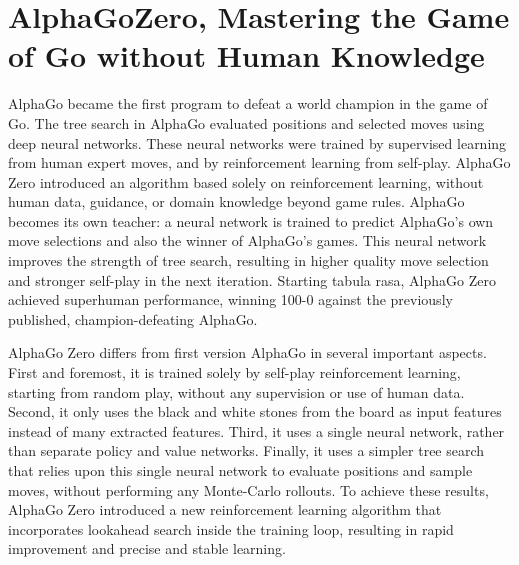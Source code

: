 \documentclass[12pt,a4paper]{report}
\begin{document}
\section{AlphaGoZero, Mastering the Game of Go without Human Knowledge}

\hspace{0.6cm} AlphaGo became the first program to defeat a world champion in the game of Go. The tree search in AlphaGo evaluated positions and selected moves using deep neural networks. These neural networks were trained by supervised learning from human expert moves, and by reinforcement learning from self-play. AlphaGo Zero introduced an algorithm based solely on reinforcement learning, without human data, guidance, or domain knowledge beyond game rules. AlphaGo becomes its own teacher: a neural network is trained to predict AlphaGo’s own move selections and also the winner of AlphaGo’s games. This neural network improves the strength of tree search, resulting in higher quality move selection and stronger self-play in the next iteration. Starting tabula rasa, AlphaGo Zero achieved superhuman performance, winning 100-0 against the previously published, champion-defeating AlphaGo.\par
\hspace{0cm}AlphaGo Zero differs from first version AlphaGo in several important aspects. First and foremost, it is trained solely by self-play reinforcement learning, starting from random play, without any supervision or use of human data. Second, it only uses the black and white stones from the board as input features instead of many extracted features. Third, it uses a single neural network, rather than separate policy and value networks. Finally, it uses a simpler tree search that relies upon this single neural network to evaluate positions and sample moves, without performing any Monte-Carlo rollouts. To achieve these results, AlphaGo Zero introduced a new reinforcement learning algorithm that incorporates lookahead search inside the training loop, resulting in rapid improvement and precise and stable learning\cite{AlphaGoZero}.\par
\end{document}
